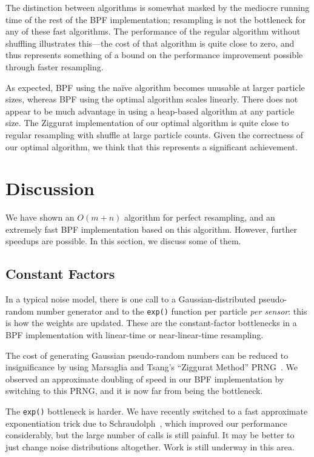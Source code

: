 \documentclass[12pt]{article}
\begin{document}
  The distinction between algorithms is somewhat masked by the mediocre running
  time of the rest of the BPF implementation; resampling is
  not the bottleneck for any of these fast algorithms.  The
  performance of the regular algorithm without shuffling illustrates
  this---the cost of that algorithm is quite close to zero,
  and thus represents something of a bound on the
  performance improvement possible through faster resampling.

  As expected, BPF using the na\"ive algorithm becomes
  unusable at larger particle sizes, whereas BPF using the
  optimal algorithm scales linearly.  There does not appear
  to be much advantage in using a heap-based algorithm at
  any particle size.  The Ziggurat implementation of our
  optimal algorithm is quite close to regular resampling
  with shuffle at large particle counts.  Given the
  correctness of our optimal algorithm, we think that this
  represents a significant achievement.

\section{Discussion}

  We have shown an $O(m + n)$ algorithm for perfect
  resampling, and an extremely fast BPF implementation based
  on this algorithm.  However, further speedups are
  possible.  In this section, we discuss some of them.

\subsection{Constant Factors}

  In a typical noise model, there is one call
  to a Gaussian-distributed pseudo-random number generator
  and to the {\tt exp()} function per particle {\em per
  sensor}: this is how the weights are updated.  These are the
  constant-factor bottlenecks in a BPF implementation with
  linear-time or near-linear-time resampling.

  The cost of generating Gaussian pseudo-random numbers can
  be reduced to insignificance by using Marsaglia and
  Tsang's ``Ziggurat Method'' PRNG~\cite{ziggurat}.  We
  observed an approximate doubling of speed in our BPF
  implementation by switching to this PRNG, and it is now
  far from being the bottleneck.

  The {\tt exp()} bottleneck is harder.  We have recently
  switched to a fast approximate exponentiation trick due to
  Schraudolph~\cite{exp}, which improved our performance
  considerably, but the large number of calls is still
  painful.  It may be better to just change noise
  distributions altogether.  Work is still underway in this
  area.
\end{document}
